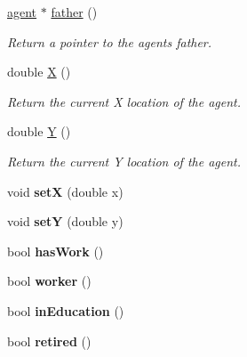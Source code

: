 \begin{DoxyCompactItemize}
\mbox{\hyperlink{classagent}{agent}} $\ast$ \mbox{\hyperlink{classagent_a1c29803a7627d786ff50d6f39b81a285}{father}} ()
\begin{DoxyCompactList}\small\item\em Return a pointer to the agent\textquotesingle{}s father. \end{DoxyCompactList}\item 
double \mbox{\hyperlink{classagent_a312bd1aeb3c660f43bb3bf5a8f0764e7}{X}} ()
\begin{DoxyCompactList}\small\item\em Return the current X location of the agent. \end{DoxyCompactList}\item 
double \mbox{\hyperlink{classagent_a56b8ea7b9138c5e4b92530d454e247ad}{Y}} ()
\begin{DoxyCompactList}\small\item\em Return the current Y location of the agent. \end{DoxyCompactList}\item 
\mbox{\label{classagent_a18cda6439bc5dcf4d444387b380e946f}} 
void {\bfseries setX} (double x)
\item 
\mbox{\label{classagent_acc06852d54c713a1d8600a1c90b6fcc7}} 
void {\bfseries setY} (double y)
\item 
\mbox{\label{classagent_a5d5e7089351107f21f00c73e342feb59}} 
bool {\bfseries has\+Work} ()
\item 
\mbox{\label{classagent_abcfbb2865a7cb599df7a6c5cbff2ce05}} 
bool {\bfseries worker} ()
\item 
\mbox{\label{classagent_a310065019aaf11c07c094c9cc5660471}} 
bool {\bfseries in\+Education} ()
\item 
\mbox{\label{classagent_a77eba7e6139ff396a166deee1f508f61}} 
bool {\bfseries retired} ()
\end{DoxyCompactItemize}
